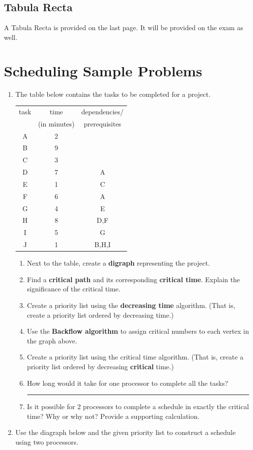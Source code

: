 \documentclass[12pt]{article}
\renewcommand{\emph}[1]{\textsf{\textbf{#1}}}
\newcommand{\ans}[1][1in]{\rule{#1}{.5pt}}
\begin{document}
\subsection*{\Large{Tabula Recta}}

A Tabula Recta is provided on the last page. It will be provided on the exam as well.

\newpage
\section*{Scheduling Sample Problems}
\begin{enumerate}
\item The table below contains the tasks to be completed for a project.

\begin{tabular}{| c|c|c|}
\hline
task& time& dependencies/\\
&(in minutes)&prerequisites\\
\hline
A&2&\\ \hline
B&9&\\ \hline
C&3&\\ \hline
D&7&A\\ \hline
E&1&C\\ \hline
F&6&A\\ \hline
G&4&E\\ \hline
H&8&D,F\\ \hline
I&5&G\\ \hline
J&1&B,H,I\\ \hline
\end{tabular}
	\begin{enumerate}
	\item Next to the table, create a \emph{digraph} representing the project.
	\item Find a \emph{critical path} and its corresponding \emph{critical time}. Explain the significance of the critical time.
	\vfill
	\item Create a priority list using the \emph{decreasing time} algorithm. (That is, create a priority list ordered by decreasing time.)
	\vfill
	\item Use the \emph{Backflow algorithm} to assign critical numbers to each vertex in the graph above.
	\item Create a priority list using the critical time algorithm. (That is, create a priority list ordered by decreasing \emph{critical} time.)
	\vfill
	\item How long would it take for one processor to complete all the tasks? \ans
	\vfill
	\item Is it possible for 2 processors to complete a schedule in exactly the critical time?  Why or why not? Provide a supporting calculation.
	\vfill
	\end{enumerate} 
\newpage
\item Use the diagraph below and the given priority list to construct a schedule using two processors.


\end{enumerate}
\end{document}
